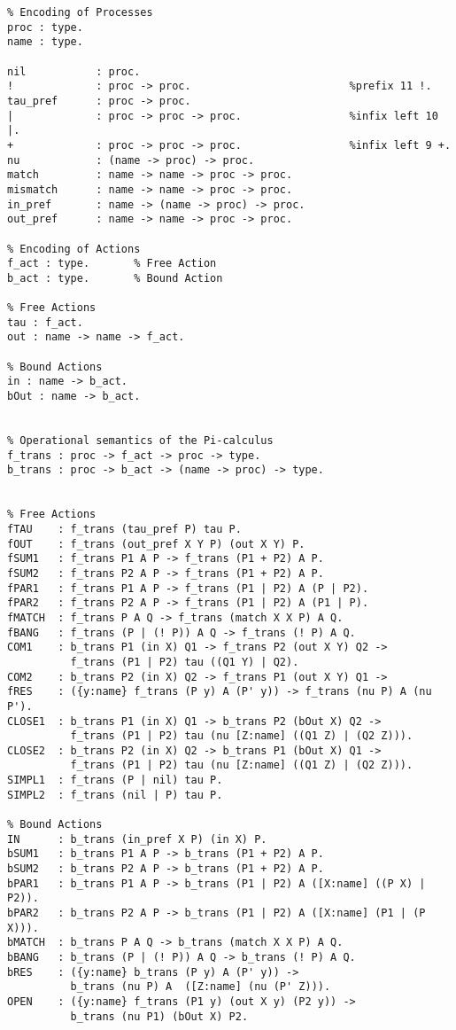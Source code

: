 \begin{verbatim}
% Encoding of Processes
proc : type.
name : type.

nil           : proc.
!             : proc -> proc.                         %prefix 11 !.
tau_pref      : proc -> proc.
|             : proc -> proc -> proc.                 %infix left 10  |.
+             : proc -> proc -> proc.                 %infix left 9 +.
nu            : (name -> proc) -> proc.
match         : name -> name -> proc -> proc.
mismatch      : name -> name -> proc -> proc.
in_pref       : name -> (name -> proc) -> proc.
out_pref      : name -> name -> proc -> proc.

% Encoding of Actions
f_act : type.		% Free Action
b_act : type.		% Bound Action

% Free Actions
tau : f_act.
out : name -> name -> f_act.

% Bound Actions
in : name -> b_act.
bOut : name -> b_act.


% Operational semantics of the Pi-calculus
f_trans : proc -> f_act -> proc -> type.
b_trans : proc -> b_act -> (name -> proc) -> type.    


% Free Actions
fTAU    : f_trans (tau_pref P) tau P.
fOUT    : f_trans (out_pref X Y P) (out X Y) P.
fSUM1   : f_trans P1 A P -> f_trans (P1 + P2) A P.
fSUM2   : f_trans P2 A P -> f_trans (P1 + P2) A P.
fPAR1   : f_trans P1 A P -> f_trans (P1 | P2) A (P | P2).
fPAR2   : f_trans P2 A P -> f_trans (P1 | P2) A (P1 | P).
fMATCH  : f_trans P A Q -> f_trans (match X X P) A Q.
fBANG   : f_trans (P | (! P)) A Q -> f_trans (! P) A Q.
COM1    : b_trans P1 (in X) Q1 -> f_trans P2 (out X Y) Q2 -> 
          f_trans (P1 | P2) tau ((Q1 Y) | Q2). 
COM2    : b_trans P2 (in X) Q2 -> f_trans P1 (out X Y) Q1 -> 
fRES    : ({y:name} f_trans (P y) A (P' y)) -> f_trans (nu P) A (nu P'). 
CLOSE1  : b_trans P1 (in X) Q1 -> b_trans P2 (bOut X) Q2 -> 
          f_trans (P1 | P2) tau (nu [Z:name] ((Q1 Z) | (Q2 Z))).
CLOSE2  : b_trans P2 (in X) Q2 -> b_trans P1 (bOut X) Q1 -> 
          f_trans (P1 | P2) tau (nu [Z:name] ((Q1 Z) | (Q2 Z))).
SIMPL1  : f_trans (P | nil) tau P.
SIMPL2  : f_trans (nil | P) tau P.

% Bound Actions
IN      : b_trans (in_pref X P) (in X) P.
bSUM1   : b_trans P1 A P -> b_trans (P1 + P2) A P.
bSUM2   : b_trans P2 A P -> b_trans (P1 + P2) A P.
bPAR1   : b_trans P1 A P -> b_trans (P1 | P2) A ([X:name] ((P X) | P2)).
bPAR2   : b_trans P2 A P -> b_trans (P1 | P2) A ([X:name] (P1 | (P X))).
bMATCH  : b_trans P A Q -> b_trans (match X X P) A Q.
bBANG   : b_trans (P | (! P)) A Q -> b_trans (! P) A Q.
bRES    : ({y:name} b_trans (P y) A (P' y)) -> 
          b_trans (nu P) A  ([Z:name] (nu (P' Z))).
OPEN    : ({y:name} f_trans (P1 y) (out X y) (P2 y)) -> 
          b_trans (nu P1) (bOut X) P2.
\end{verbatim}
